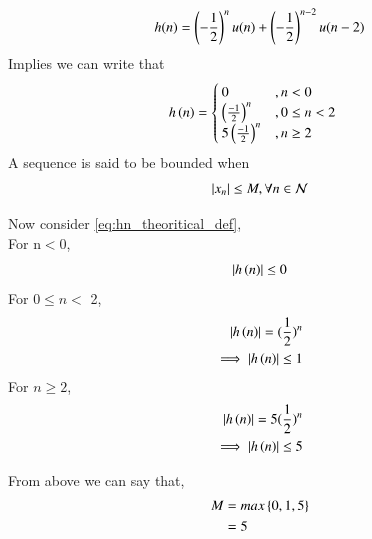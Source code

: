 \documentclass[journal,12pt,twocolumn]{IEEEtran}
\renewcommand\thesection{\arabic{section}}
\begin{document}
\begin{enumerate}[label=\thesection.\arabic*]
\begin{equation}
	h(n) = \left(-\frac{1}{2}\right)^{n}u(n) + \left(-\frac{1}{2}\right)^{n-2}u(n-2)
\end{equation}
Implies we can write that\\
\begin{align}
	h\left(n\right) &= \begin{cases}
					 0 &, n < 0\\
					 \left(\frac{-1}{2}\right)^n &, 0\leq n<2\\
					 5\left(\frac{-1}{2}\right)^n &, n \geq 2
				  \end{cases}\label{eq:hn_theoritical_def}
\end{align}
A sequence is said to be bounded when 
\begin{align}
	\left\vert x_n\right\vert \leq M , \forall n \in \mathcal{N}\label{def:bounded_seq_def}
\end{align}  

Now consider \eqref{eq:hn_theoritical_def},\\
For n$<$0,
\begin{equation}
	\left\vert h\left(n\right)\right\vert \leq 0
\end{equation}
For $0 \leq n <$ 2,
\begin{align}
	\left\vert h\left(n\right)\right\vert = (\frac{1}{2})^n\\
	\implies \left\vert h\left(n\right)\right\vert \leq 1
\end{align}
For $n\geq 2$,
\begin{align}
	\left\vert h\left(n\right)\right\vert = 5(\frac{1}{2})^n\\
	\implies \left\vert h\left(n\right)\right\vert \leq 5
\end{align}

From above we can say that,
      \begin{align}
        M &= max\left\{0,1,5\right\} \\
          &= 5\label{eq:hn_bounded_proof}
      \end{align}


\end{enumerate}
\end{document}
